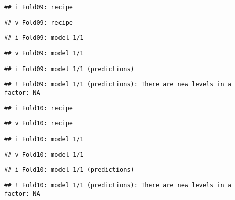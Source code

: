 \documentclass[
]{article}
\newenvironment{Shaded}{\begin{snugshade}}{\end{snugshade}}
\newcommand{\DataTypeTok}[1]{\textcolor[rgb]{0.13,0.29,0.53}{#1}}
\newcommand{\DecValTok}[1]{\textcolor[rgb]{0.00,0.00,0.81}{#1}}
\newcommand{\KeywordTok}[1]{\textcolor[rgb]{0.13,0.29,0.53}{\textbf{#1}}}
\newcommand{\NormalTok}[1]{#1}
\newcommand{\OperatorTok}[1]{\textcolor[rgb]{0.81,0.36,0.00}{\textbf{#1}}}
\newcommand{\StringTok}[1]{\textcolor[rgb]{0.31,0.60,0.02}{#1}}
\begin{document}
\begin{verbatim}
## i Fold09: recipe
\end{verbatim}

\begin{verbatim}
## v Fold09: recipe
\end{verbatim}

\begin{verbatim}
## i Fold09: model 1/1
\end{verbatim}

\begin{verbatim}
## v Fold09: model 1/1
\end{verbatim}

\begin{verbatim}
## i Fold09: model 1/1 (predictions)
\end{verbatim}

\begin{verbatim}
## ! Fold09: model 1/1 (predictions): There are new levels in a factor: NA
\end{verbatim}

\begin{verbatim}
## i Fold10: recipe
\end{verbatim}

\begin{verbatim}
## v Fold10: recipe
\end{verbatim}

\begin{verbatim}
## i Fold10: model 1/1
\end{verbatim}

\begin{verbatim}
## v Fold10: model 1/1
\end{verbatim}

\begin{verbatim}
## i Fold10: model 1/1 (predictions)
\end{verbatim}

\begin{verbatim}
## ! Fold10: model 1/1 (predictions): There are new levels in a factor: NA
\end{verbatim}

\begin{Shaded}
\end{Shaded}
\end{document}
